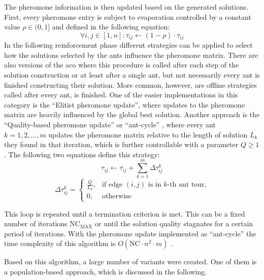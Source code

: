 The pheromone information is then updated based on the generated solutions. First, every pheromone entry is subject to evaporation controlled by a constant value $\rho \in (0,1]$ and defined in the following equation:
\begin{equation}
	\label{eq:aco_evap}
	\forall i,j \in [1,n]: \tau_{ij} \leftarrow (1-\rho) \cdot \tau_{ij}
\end{equation}
In the following reinforcement phase different strategies can be applied to select how the solutions selected by the ants influence the pheromone matrix. There are also versions of the \gls{aco} where this procedure is called after each step of the solution construction or at least after a single ant, but not necessarily every ant is finished constructing their solution. More common, however, are offline strategies called after every ant, is finished. One of the easier implementations in this category is the \enquote{Elitist pheromone update}, where updates to the pheromone matrix are heavily influenced by the global best solution. Another approach is the \enquote{Quality-based pheromone update} or \enquote{ant-cycle} \cite{dorigo1996ant}, where every ant $k = 1,2,...,m$ updates the pheromone matrix relative to the length of solution $L_k$ they found in that iteration, which is further controllable with a parameter $Q \geq 1$. The following two equations define this strategy:
\begin{equation}
	\tau_{ij} \leftarrow \tau_{ij} + \sum_{k=1}^{m} \Delta\tau_{ij}^k 
\end{equation}
\begin{equation}
	\Delta\tau_{ij}^k = \begin{cases}
		\frac{Q}{L_k}, &\text{if edge } (i,j) \text{ is in $k$-th ant tour,} \\
		0, &\text{otherwise}
	\end{cases}
\end{equation}

This loop is repeated until a termination criterion is met. This can be a fixed number of iterations $\text{NC}_{\text{MAX}}$ or until the solution quality stagnates for a certain period of iterations. With the pheromone update implemented as \enquote{ant-cycle} the time complexity of this algorithm is $O(\text{NC}\cdot n^2 \cdot m)$ \cite{dorigo1996ant}.

Based on this algorithm, a large number of variants were created. One of them is a population-based approach, which is discussed in the following.

